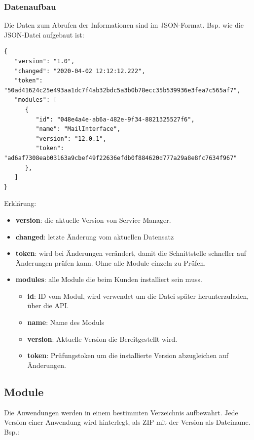 \documentclass{article}
\begin{document}
\subsubsection{Datenaufbau}

Die Daten zum Abrufen der Informationen sind im JSON-Format. 
Bsp. wie die JSON-Datei aufgebaut ist:
\begin{verbatim}
{
   "version": "1.0",
   "changed": "2020-04-02 12:12:12.222",
   "token": "50ad41624c25e493aa1dc7f4ab32bdc5a3b0b78ecc35b539936e3fea7c565af7",
   "modules": [
      {
         "id": "048e4a4e-ab6a-482e-9f34-8821325527f6",
         "name": "MailInterface",
         "version": "12.0.1",
         "token": "ad6af7308eab03163a9cbef49f22636efdb0f884620d777a29a8e8fc7634f967"
      },
   ]
}
\end{verbatim}

Erklärung: 

\begin{itemize}
  \item \textbf{version}: die aktuelle Version von Service-Manager.
  \item \textbf{changed}: letzte Änderung vom aktuellen Datensatz
  \item \textbf{token}: wird bei Änderungen verändert, damit die Schnittstelle schneller auf Änderungen prüfen kann. Ohne alle Module einzeln zu Prüfen.
  \item \textbf{modules}: alle Module die beim Kunden installiert sein muss.
  \begin{itemize}
  	\item \textbf{id}: ID vom Modul, wird verwendet um die Datei später herunterzuladen, über die API.
  	\item \textbf{name}: Name des Moduls
  	\item \textbf{version}: Aktuelle Version die Bereitgestellt wird.
  	\item \textbf{token}: Prüfungstoken um die installierte Version abzugleichen auf Änderungen.
  \end{itemize}
\end{itemize}

\subsection{Module}

Die Anwendungen werden in einem bestimmten Verzeichnis aufbewahrt. Jede Version einer Anwendung wird hinterlegt, als ZIP mit der Version als Dateiname.
Bsp.: 
\end{document}
